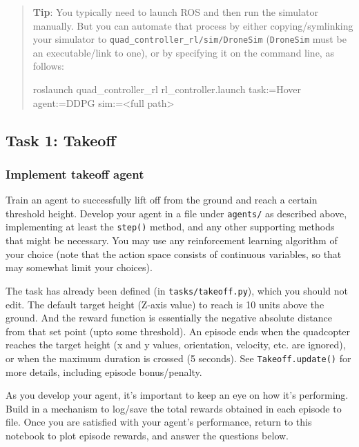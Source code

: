 \documentclass[11pt]{article}
\newenvironment{Shaded}{}{}
\newcommand{\NormalTok}[1]{{#1}}
\newcommand{\OperatorTok}[1]{\textcolor[rgb]{0.40,0.40,0.40}{{#1}}}
\newcommand{\ExtensionTok}[1]{{#1}}
\begin{document}
\begin{quote}
\textbf{Tip}: You typically need to launch ROS and then run the
simulator manually. But you can automate that process by either
copying/symlinking your simulator to
\texttt{quad\_controller\_rl/sim/DroneSim} (\texttt{DroneSim} must be an
executable/link to one), or by specifying it on the command line, as
follows:

\begin{Shaded}
\begin{Highlighting}[]
\ExtensionTok{roslaunch}\NormalTok{ quad_controller_rl rl_controller.launch task:=Hover agent:=DDPG sim:=}\OperatorTok{<}\NormalTok{full path}\OperatorTok{>}
\end{Highlighting}
\end{Shaded}
\end{quote}

\hypertarget{task-1-takeoff}{%
\subsection{Task 1: Takeoff}\label{task-1-takeoff}}

\hypertarget{implement-takeoff-agent}{%
\subsubsection{Implement takeoff agent}\label{implement-takeoff-agent}}

Train an agent to successfully lift off from the ground and reach a
certain threshold height. Develop your agent in a file under
\texttt{agents/} as described above, implementing at least the
\texttt{step()} method, and any other supporting methods that might be
necessary. You may use any reinforcement learning algorithm of your
choice (note that the action space consists of continuous variables, so
that may somewhat limit your choices).

The task has already been defined (in \texttt{tasks/takeoff.py}), which
you should not edit. The default target height (Z-axis value) to reach
is 10 units above the ground. And the reward function is essentially the
negative absolute distance from that set point (upto some threshold). An
episode ends when the quadcopter reaches the target height (x and y
values, orientation, velocity, etc. are ignored), or when the maximum
duration is crossed (5 seconds). See \texttt{Takeoff.update()} for more
details, including episode bonus/penalty.

As you develop your agent, it's important to keep an eye on how it's
performing. Build in a mechanism to log/save the total rewards obtained
in each episode to file. Once you are satisfied with your agent's
performance, return to this notebook to plot episode rewards, and answer
the questions below.
\end{document}
